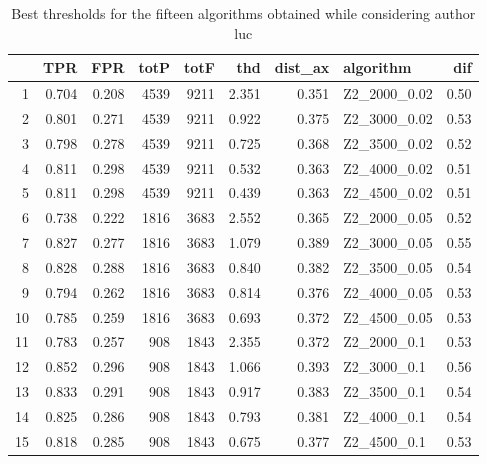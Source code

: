 \documentclass{article}\usepackage[]{graphicx}\usepackage[]{color}
\begin{document}
\begin{table}[ht]
\centering
\begin{tabular}{rrrrrrrlr}
  \hline
 & TPR & FPR & totP & totF & thd & dist\_ax & algorithm & dif \\ 
  \hline
1 & 0.704 & 0.208 & 4539 & 9211 & 2.351 & 0.351 & Z2\_2000\_0.02 & 0.50 \\ 
  2 & 0.801 & 0.271 & 4539 & 9211 & 0.922 & 0.375 & Z2\_3000\_0.02 & 0.53 \\ 
  3 & 0.798 & 0.278 & 4539 & 9211 & 0.725 & 0.368 & Z2\_3500\_0.02 & 0.52 \\ 
  4 & 0.811 & 0.298 & 4539 & 9211 & 0.532 & 0.363 & Z2\_4000\_0.02 & 0.51 \\ 
  5 & 0.811 & 0.298 & 4539 & 9211 & 0.439 & 0.363 & Z2\_4500\_0.02 & 0.51 \\ 
  6 & 0.738 & 0.222 & 1816 & 3683 & 2.552 & 0.365 & Z2\_2000\_0.05 & 0.52 \\ 
  7 & 0.827 & 0.277 & 1816 & 3683 & 1.079 & 0.389 & Z2\_3000\_0.05 & 0.55 \\ 
  8 & 0.828 & 0.288 & 1816 & 3683 & 0.840 & 0.382 & Z2\_3500\_0.05 & 0.54 \\ 
  9 & 0.794 & 0.262 & 1816 & 3683 & 0.814 & 0.376 & Z2\_4000\_0.05 & 0.53 \\ 
  10 & 0.785 & 0.259 & 1816 & 3683 & 0.693 & 0.372 & Z2\_4500\_0.05 & 0.53 \\ 
  11 & 0.783 & 0.257 & 908 & 1843 & 2.355 & 0.372 & Z2\_2000\_0.1 & 0.53 \\ 
  12 & 0.852 & 0.296 & 908 & 1843 & 1.066 & 0.393 & Z2\_3000\_0.1 & 0.56 \\ 
  13 & 0.833 & 0.291 & 908 & 1843 & 0.917 & 0.383 & Z2\_3500\_0.1 & 0.54 \\ 
  14 & 0.825 & 0.286 & 908 & 1843 & 0.793 & 0.381 & Z2\_4000\_0.1 & 0.54 \\ 
  15 & 0.818 & 0.285 & 908 & 1843 & 0.675 & 0.377 & Z2\_4500\_0.1 & 0.53 \\ 
   \hline
\end{tabular}
\caption{Best thresholds for the fifteen algorithms obtained while considering author luc} 
\end{table}
\end{document}

